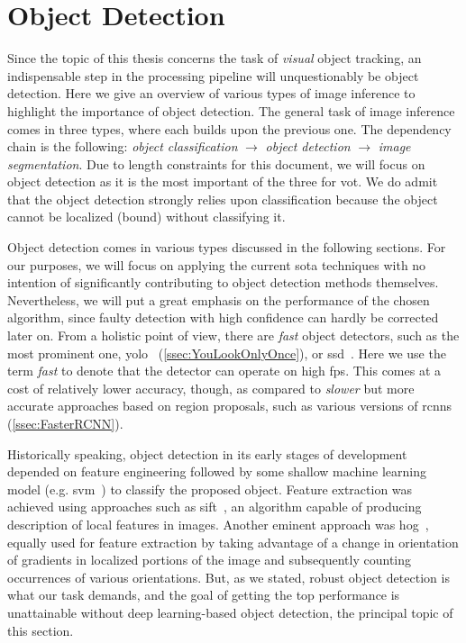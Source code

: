 \section{Object Detection}

Since the topic of this thesis concerns the task of \emph{visual} object tracking, an indispensable step in the processing pipeline will unquestionably be object detection. Here we give an overview of various types of image inference to highlight the importance of object detection. The general task of image inference comes in three types, where each builds upon the previous one. The dependency chain is the following: \emph{object classification} $\to$ \emph{object detection} $\to$ \emph{image segmentation}. Due to length constraints for this document, we will focus on object detection as it is the most important of the three for \gls{vot}. We do admit that the object detection strongly relies upon classification because the object cannot be localized (bound) without classifying it.

Object detection comes in various types discussed in the following sections. For our purposes, we will focus on applying the current \gls{sota} techniques with no intention of significantly contributing to object detection methods themselves. Nevertheless, we will put a great emphasis on the performance of the chosen algorithm, since faulty detection with high confidence can hardly be corrected later on. From a holistic point of view, there are \emph{fast} object detectors, such as the most prominent one, \gls{yolo}~\cite{Redmon2016} (\cref{ssec:YouLookOnlyOnce}), or \gls{ssd}~\cite{Liu2016}. Here we use the term \emph{fast} to denote that the detector can operate on high \gls{fps}. This comes at a cost of relatively lower accuracy, though, as compared to \emph{slower} but more accurate approaches based on region proposals, such as various versions of \glspl{rcnn} (\cref{ssec:FasterRCNN}).

Historically speaking, object detection in its early stages of development depended on feature engineering followed by some shallow machine learning model (e.g. \gls{svm}~\cite{cortes1995support}) to classify the proposed object. Feature extraction was achieved using approaches such as \gls{sift}~\cite{Lowe1999}, an algorithm capable of producing description of local features in images. Another eminent approach was \gls{hog}~\cite{osti_6007283}, equally used for feature extraction by taking advantage of a change in orientation of gradients in localized portions of the image and subsequently counting occurrences of various orientations. But, as we stated, robust object detection is what our task demands, and the goal of getting the top performance is unattainable without deep learning-based object detection, the principal topic of this section.

